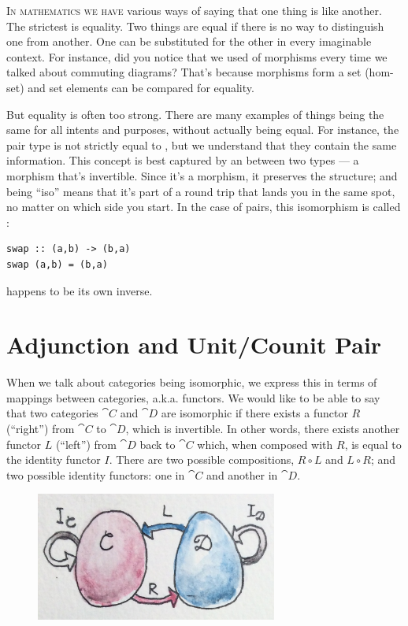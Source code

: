 \lettrine[lhang=0.17]{I}{n mathematics we have} various ways of saying that one thing is like
another. The strictest is equality. Two things are equal if there is no
way to distinguish one from another. One can be substituted for the
other in every imaginable context. For instance, did you notice that we
used  of morphisms every time we talked about commuting
diagrams? That's because morphisms form a set (hom-set) and set elements
can be compared for equality.

But equality is often too strong. There are many examples of things
being the same for all intents and purposes, without actually being
equal. For instance, the pair type  is not
strictly equal to , but we understand that they
contain the same information. This concept is best captured by an
 between two types --- a morphism that's invertible.
Since it's a morphism, it preserves the structure; and being ``iso''
means that it's part of a round trip that lands you in the same spot, no
matter on which side you start. In the case of pairs, this isomorphism
is called :

\begin{Verbatim}
swap :: (a,b) -> (b,a)
swap (a,b) = (b,a)
\end{Verbatim}
 happens to be its own inverse.

\section{Adjunction and Unit/Counit Pair}

When we talk about categories being isomorphic, we express this in terms
of mappings between categories, a.k.a. functors. We would like to be
able to say that two categories $\cat{C}$ and $\cat{D}$ are isomorphic if
there exists a functor $R$ (``right'') from $\cat{C}$ to $\cat{D}$,
which is invertible. In other words, there exists another functor
$L$ (``left'') from $\cat{D}$ back to $\cat{C}$ which, when
composed with $R$, is equal to the identity functor $I$.
There are two possible compositions, $R \circ L$ and
$L \circ R$; and two possible identity functors: one in $\cat{C}$
and another in $\cat{D}$.

\begin{figure}[H]
\centering
\includegraphics[width=3.12500in]{images/adj-1.jpg}
\end{figure}

